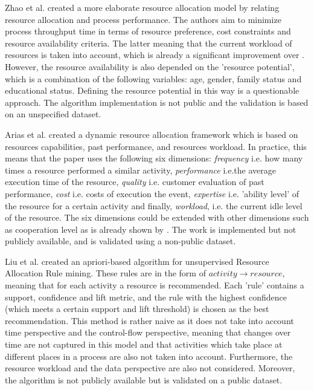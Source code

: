 Zhao et al. \cite{Zhao2015} created a more elaborate resource allocation model by relating resource allocation and process performance. The authors aim to minimize process throughput time in terms of resource preference, cost constraints and resource availability criteria. The latter meaning that the current workload of resources is taken into account, which is already a significant improvement over \cite{Huang2012}. However, the resource availability is also depended on the 'resource potential', which is a combination of the following variables: age, gender, family status and educational status. Defining the resource potential in this way is a questionable approach. The algorithm implementation is not public and the validation is based on an unspecified dataset.

Arias et al. \cite{arias2015framework} created a dynamic resource allocation framework which is based on resources capabilities, past performance, and resources workload. In practice, this means that the paper uses the following six dimensions: \textit{frequency} i.e. how many times a resource performed a similar activity, \textit{performance} i.e.the average execution time of the resource, \textit{quality} i.e. customer evaluation of past performance, \textit{cost} i.e. costs of execution the event, \textit{expertise} i.e. 'ability level' of the resource for a certain activity and finally, \textit{workload}, i.e. the current idle level of the resource. The six dimensions could be extended with other dimensions such as cooperation level as is already shown by \cite{Huang2012}. The work is implemented but not publicly available, and is validated using a non-public dataset. 

Liu et al. \cite{Liu2012} created an apriori-based algorithm for unsupervised Resource Allocation Rule mining. These rules are in the form of $activity \to resource$, meaning that for each activity a resource is recommended. Each 'rule' contains a support, confidence and lift metric, and the rule with the highest confidence (which meets a certain support and lift threshold) is chosen as the best recommendation. This method is rather naive as it does not take into account time perspective and the control-flow perspective, meaning that changes over time are not captured in this model and that activities which take place at different places in a process are also not taken into account. Furthermore, the resource workload and the data perspective are also not considered. Moreover, the algorithm is not publicly available but is validated on a public dataset. 

